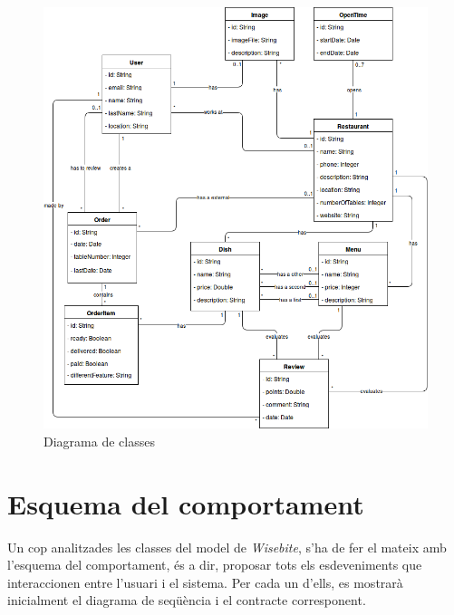 \begin{figure}[!h]
\centering
\includegraphics[scale=0.5]{Figures/diagrama_clases.png}
\caption{Diagrama de classes}
\end{figure}


\clearpage
\section{Esquema del comportament}

Un cop analitzades les classes del model de \textit{Wisebite}, s'ha de fer el mateix amb l'esquema del comportament, és a dir, proposar tots els esdeveniments que interaccionen entre l'usuari i el sistema. Per cada un d'ells, es mostrarà inicialment el diagrama de seqüència i el contracte corresponent.
\\\\

